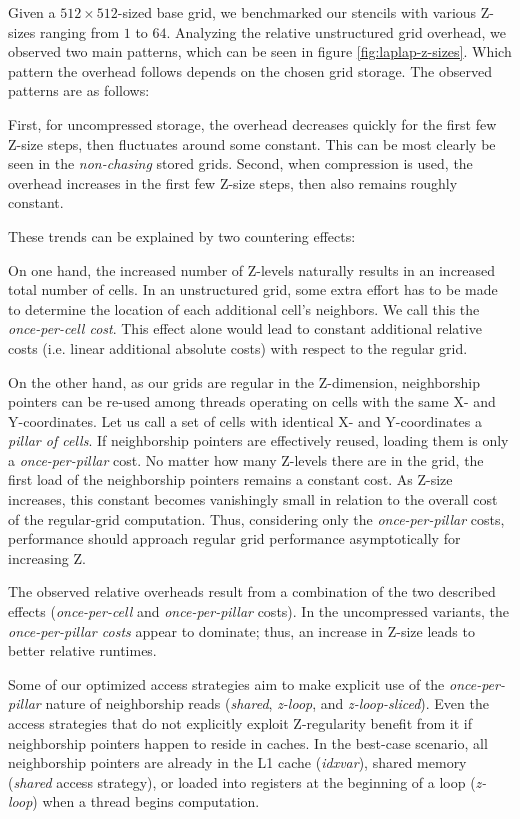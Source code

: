 Given a $512\times 512$-sized base grid, we benchmarked our stencils with various Z-sizes ranging from $1$ to $64$. Analyzing the relative unstructured grid overhead, we observed two main patterns, which can be seen in figure \ref{fig:laplap-z-sizes}. Which pattern the overhead follows depends on the chosen grid storage. The observed patterns are as follows:

First, for uncompressed storage, the overhead decreases quickly for the first few Z-size steps, then fluctuates around some constant. This can be most clearly be seen in the \emph{non-chasing} stored grids. Second, when compression is used, the overhead increases in the first few Z-size steps, then also remains roughly constant.

These trends can be explained by two countering effects:

On one hand, the increased number of Z-levels naturally results in an increased total number of cells. In an unstructured grid, some extra effort has to be made to determine the location of each additional cell's neighbors. We call this the \emph{once-per-cell cost}. This effect alone would lead to constant additional relative costs (i.e. linear additional absolute costs) with respect to the regular grid.

On the other hand, as our grids are regular in the Z-dimension, neighborship pointers can be re-used among threads operating on cells with the same X- and Y-coordinates. Let us call a set of cells with identical X- and Y-coordinates a \emph{pillar of cells}. If neighborship pointers are effectively reused, loading them is only a \emph{once-per-pillar} cost. No matter how many Z-levels there are in the grid, the first load of the neighborship pointers remains a constant cost. As Z-size increases, this constant becomes vanishingly small in relation to the overall cost of the regular-grid computation. Thus, considering only the \emph{once-per-pillar} costs, performance should approach regular grid performance asymptotically for increasing Z. 

The observed relative overheads result from a combination of the two described effects (\emph{once-per-cell} and \emph{once-per-pillar} costs). In the uncompressed variants, the \emph{once-per-pillar costs} appear to dominate; thus, an increase in Z-size leads to better relative runtimes.

Some of our optimized access strategies aim to make explicit use of the \emph{once-per-pillar} nature of neighborship reads (\emph{shared}, \emph{z-loop}, and \emph{z-loop-sliced}). Even the access strategies that do not explicitly exploit Z-regularity benefit from it if neighborship pointers happen to reside in caches.  In the best-case scenario, all neighborship pointers are already in the L1 cache (\emph{idxvar}), shared memory (\emph{shared} access strategy), or loaded into registers at the beginning of a loop (\emph{z-loop}) when a thread begins computation.

